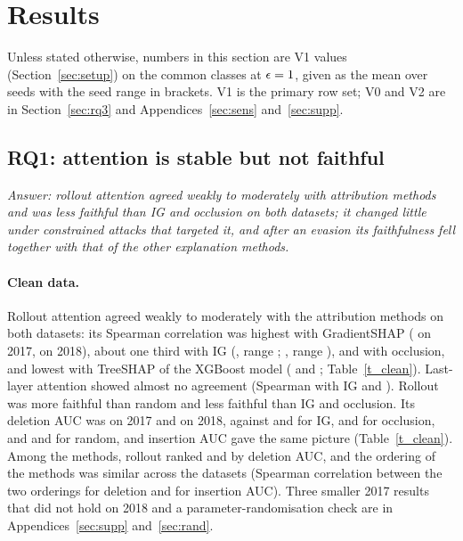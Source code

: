 \section{Results}
\label{sec:results}

Unless stated otherwise, numbers in this section are V1 values (Section~\ref{sec:setup}) on the \nCommonClasses{}
common classes at $\epsilon = 1$, given as the mean over seeds with the seed range in brackets.
V1 is the primary row set; V0 and V2 are in Section~\ref{sec:rq3} and Appendices~\ref{sec:sens} and~\ref{sec:supp}.

\subsection{RQ1: attention is stable but not faithful}
\label{sec:rq1}
\emph{Answer: rollout attention agreed weakly to moderately with attribution methods and was less faithful than IG and
occlusion on both datasets; it changed little under constrained attacks that targeted it, and after an evasion its
faithfulness fell together with that of the other explanation methods.}

\paragraph{Clean data.}
Rollout attention agreed weakly to moderately with the attribution methods on both datasets: its Spearman correlation
was highest with GradientSHAP (\spRolloutGShapVoneSeventeen{} on 2017, \spRolloutGShapVoneEighteen{} on 2018), about one
third with IG (\spRolloutIGVoneSeventeen{}, range \spRolloutIGVoneSeventeenRange; \spRolloutIGVoneEighteen{}, range
\spRolloutIGVoneEighteenRange), \spRolloutOcclVoneSeventeen{} and \spRolloutOcclVoneEighteen{} with occlusion, and
lowest with TreeSHAP of the XGBoost model (\spRolloutTreeShapVoneSeventeen{} and \spRolloutTreeShapVoneEighteen;
Table~\ref{t_clean}).
Last-layer attention showed almost no agreement (Spearman with IG \spLastIGVoneSeventeen{} and \spLastIGVoneEighteen).
Rollout was more faithful than random and less faithful than IG and occlusion.
Its deletion AUC was \aucDelRolloutVoneSeventeen{} on 2017 and \aucDelRolloutVoneEighteen{} on 2018, against
\aucDelIGVoneSeventeen{} and \aucDelIGVoneEighteen{} for IG, \aucDelOcclVoneSeventeen{} and \aucDelOcclVoneEighteen{}
for occlusion, and \aucDelRandomVoneSeventeen{} and \aucDelRandomVoneEighteen{} for random, and insertion AUC gave the
same picture (Table~\ref{t_clean}).
Among the \nMethods{} methods, rollout ranked \rankDelRolloutSeventeen{} and \rankDelRolloutEighteen{} by deletion AUC,
and the ordering of the methods was similar across the datasets (Spearman correlation between the two orderings
\ordSpDelVone{} for deletion and \ordSpInsVone{} for insertion AUC).
Three smaller 2017 results that did not hold on 2018 and a parameter-randomisation check are in
Appendices~\ref{sec:supp} and~\ref{sec:rand}.

